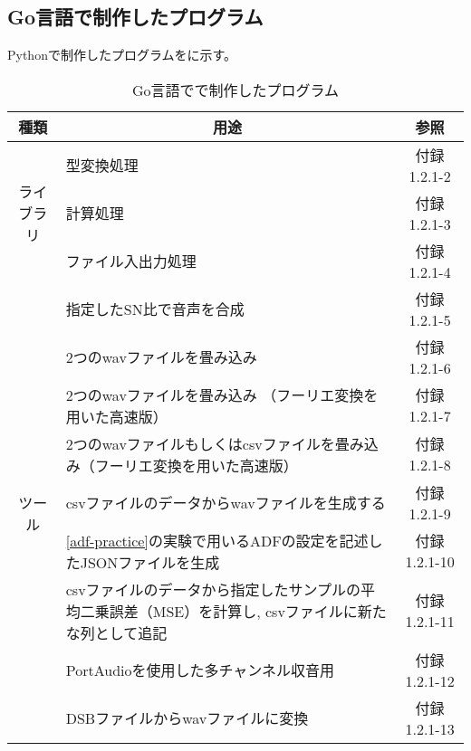 
\subsection{Go言語で制作したプログラム}\label{go}

Pythonで制作したプログラムをに示す。

\begin{table}[H]
  \centering
  \caption{Go言語でで制作したプログラム}
  \label{tab:program_go}
  \begin{tabular}{|c|l|c|}
  \hline
  種類                     & \multicolumn{1}{c|}{用途}                                  & 参照       \\ \hline
  \multirow{3}{*}{ライブラリ} & 型変換処理                                                    & 付録 1.2.1-2  \\ \cline{2-3} 
                         & 計算処理                                                     & 付録 1.2.1-3  \\ \cline{2-3} 
                         & ファイル入出力処理                                                & 付録 1.2.1-4  \\ \hline
  \multirow{9}{*}{ツール}   & 指定したSN比で音声を合成                                            & 付録 1.2.1-5  \\ \cline{2-3} 
                         & 2つのwavファイルを畳み込み                                          & 付録 1.2.1-6  \\ \cline{2-3} 
                         & 2つのwavファイルを畳み込み （フーリエ変換を用いた高速版）                          & 付録 1.2.1-7  \\ \cline{2-3} 
                         & 2つのwavファイルもしくはcsvファイルを畳み込み（フーリエ変換を用いた高速版）                & 付録 1.2.1-8  \\ \cline{2-3} 
                         & csvファイルのデータからwavファイルを生成する                                & 付録 1.2.1-9  \\ \cline{2-3} 
                         & \ref{adf-practice}の実験で用いるADFの設定を記述したJSONファイルを生成          & 付録 1.2.1-10 \\ \cline{2-3} 
                         & csvファイルのデータから指定したサンプルの平均二乗誤差（MSE）を計算し, csvファイルに新たな列として追記 & 付録 1.2.1-11 \\ \cline{2-3} 
                         & PortAudioを使用した多チャンネル収音用                                  & 付録 1.2.1-12 \\ \cline{2-3} 
                         & DSBファイルからwavファイルに変換                                      & 付録 1.2.1-13 \\ \hline
  \end{tabular}
  \end{table}

